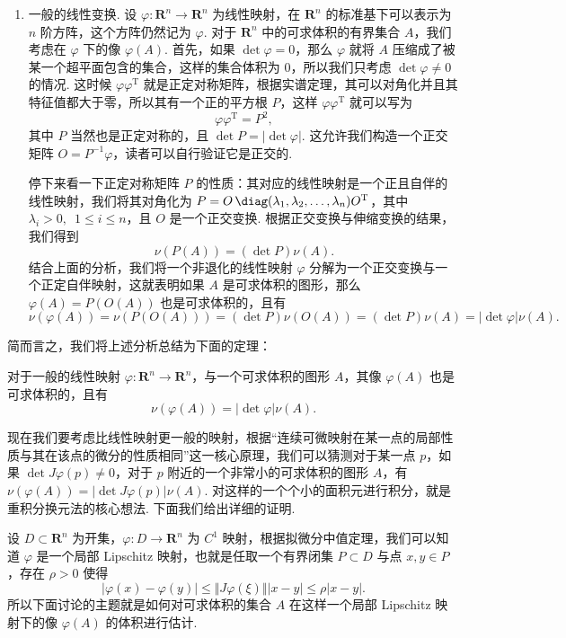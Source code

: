 \begin{enumerate}[label=(\arabic*)]
    \item 一般的线性变换. 设 $\varphi\colon \mathbf{R}^n\to \mathbf{R}^n$ 为线性映射，在 $\mathbf{R}^n$ 的标准基下可以表示为 $n$ 阶方阵，这个方阵仍然记为 $\varphi$. 对于 $\mathbf{R}^n$ 中的可求体积的有界集合 $A$，我们考虑在 $\varphi$ 下的像 $\varphi(A)$. 首先，如果 $\det\varphi = 0$，那么 $\varphi$ 就将 $A$ 压缩成了被某一个超平面包含的集合，这样的集合体积为 $0$，所以我们只考虑 $\det\varphi\neq 0$ 的情况. 这时候 $\varphi\varphi^\mathrm{T}$ 就是正定对称矩阵，根据实谱定理，其可以对角化并且其特征值都大于零，所以其有一个正的平方根 $P$，这样 $\varphi\varphi^\mathrm{T}$ 就可以写为 \[\varphi\varphi^\mathrm{T} = P^2,\]
          其中 $P$ 当然也是正定对称的，且 $\det P = \lvert\det\varphi\rvert$. 这允许我们构造一个正交矩阵 $O = P^{-1}\varphi$，读者可以自行验证它是正交的.

          停下来看一下正定对称矩阵 $P$ 的性质：其对应的线性映射是一个正且自伴的线性映射，我们将其对角化为 $P = O\,\diag(\lambda_1, \lambda_2, \ldots, \lambda_n) O^\mathrm{T}$，其中 $\lambda_i > 0,\enspace 1\leqslant i\leqslant n$，且 $O$ 是一个正交变换. 根据正交变换与伸缩变换的结果，我们得到 \[\nu(P(A)) = (\det P)\nu(A).\]
          结合上面的分析，我们将一个非退化的线性映射 $\varphi$ 分解为一个正交变换与一个正定自伴映射，这就表明如果 $A$ 是可求体积的图形，那么 $\varphi(A) = P(O(A))$ 也是可求体积的，且有 \[\nu(\varphi(A)) = \nu(P(O(A))) = (\det P)\nu(O(A)) = (\det P)\nu(A) = \lvert\det\varphi\rvert \nu(A).\]
\end{enumerate}
简而言之，我们将上述分析总结为下面的定理：

\begin{theorem}{}{}
    对于一般的线性映射 $\varphi\colon \mathbf{R}^n\to \mathbf{R}^n$，与一个可求体积的图形 $A$，其像 $\varphi(A)$ 也是可求体积的，且有 \[\nu(\varphi(A)) = \lvert\det\varphi\rvert \nu(A).\]
\end{theorem}

现在我们要考虑比线性映射更一般的映射，根据``连续可微映射在某一点的局部性质与其在该点的微分的性质相同''这一核心原理，我们可以猜测对于某一点 $p$，如果 $\det J\varphi(p)\neq 0$，对于 $p$ 附近的一个非常小的可求体积的图形 $A$，有 $\nu(\varphi(A)) = \lvert\det J\varphi(p)\rvert \nu(A)$. 对这样的一个个小的面积元进行积分，就是重积分换元法的核心想法. 下面我们给出详细的证明.

设 $D\subset \mathbf{R}^n$ 为开集，$\varphi\colon D\to \mathbf{R}^n$ 为 $C^1$ 映射，根据拟微分中值定理，我们可以知道 $\varphi$ 是一个局部 Lipschitz 映射，也就是任取一个有界闭集 $P\subset D$ 与点 $x, y\in P$，存在 $\rho > 0$ 使得 \[\vert \varphi(x) - \varphi(y)\vert \leqslant \Vert J\varphi(\xi)\Vert \vert x - y\vert \leqslant \rho \vert x - y\vert.\]
所以下面讨论的主题就是如何对可求体积的集合 $A$ 在这样一个局部 Lipschitz 映射下的像 $\varphi(A)$ 的体积进行估计.

